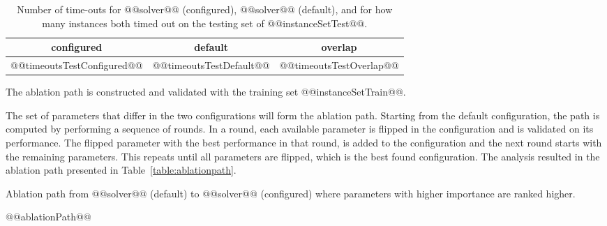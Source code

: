 \documentclass[british]{article}
\newif\iftest
\newif\ifablation
\begin{document}
        \begin{table}[htbp]
            \begin{center}
                \begin{tabular}{ccc}
                    configured & default & overlap \\ \hline
                    @@timeoutsTestConfigured@@ & @@timeoutsTestDefault@@ & @@timeoutsTestOverlap@@
                \end{tabular}
            \end{center}
            \caption{Number of time-outs for @@solver@@ (configured), @@solver@@ (default), and for how many instances both timed out on the testing set of @@instanceSetTest@@.}
            \label{tbl:timeouts_test}
        \end{table}


\fi %

\ifablation
    \section{Parameter importance via Ablation}

    Ablation analysis~\cite{FawcettHoos16} is performed from the @@solver@@ (default) to @@solver@@ (configured) to see which parameter changes between them contribute most to the improved performance.
    \iftest
    The ablation path uses the training set @@instanceSetTrain@@ and validation is perform on the test set @@instanceSetTest@@.
    \else
    The ablation path is constructed and validated with the training set @@instanceSetTrain@@.
    \fi
    The set of parameters that differ in the two configurations will form the ablation path.
    Starting from the default configuration, the path is computed by performing a sequence of rounds.
    In a round, each available parameter is flipped in the configuration and is validated on its performance.
    The flipped parameter with the best performance in that round, is added to the configuration and the next round starts with the remaining parameters.
    This repeats until all parameters are flipped, which is the best found configuration.
    The analysis resulted in the ablation path presented in Table~\ref{table:ablationpath}.


    \begin{table}[htbp]
        \caption{Ablation path from @@solver@@ (default) to @@solver@@ (configured) where parameters with higher importance are ranked higher.}
        \label{table:ablationpath}
        \begin{center}
        \footnotesize
            @@ablationPath@@
        \end{center}
    \end{table}

\fi %



\end{document}
